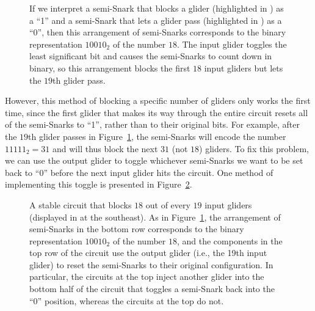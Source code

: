 \begin{figure}[!htb]
	\centering
	\caption{If we interpret a semi-Snark that blocks a glider (highlighted in ) as a ``1'' and a semi-Snark that lets a glider pass (highlighted in ) as a ``0'', then this arrangement of semi-Snarks corresponds to the binary representation $10010_2$ of the number $18$. The input glider toggles the least significant bit and causes the semi-Snarks to count down in binary, so this arrangement blocks the first $18$ input gliders but lets the $19$th glider pass.}
	\label{fig:block_18_gliders}
\end{figure}

However, this method of blocking a specific number of gliders only works the first time, since the first glider that makes its way through the entire circuit resets all of the semi-Snarks to ``1'', rather than to their original bits. For example, after the $19$th glider passes in Figure~\ref{fig:block_18_gliders}, the semi-Snarks will encode the number $11111_2 = 31$ and will thus block the next $31$ (not $18$) gliders. To fix this problem, we can use the output glider to toggle whichever semi-Snarks we want to be set back to ``0'' before the next input glider hits the circuit. One method of implementing this toggle is presented in Figure~\ref{fig:block_18_gliders_repeatable}.%

\begin{figure}[!htb]
	\centering
	\caption{A stable circuit that blocks $18$ out of every $19$ input gliders (displayed in  at the southeast). As in Figure~\ref{fig:block_18_gliders}, the arrangement of semi-Snarks in the bottom row corresponds to the binary representation $10010_2$ of the number $18$, and the components in the top row of the circuit use the output glider (i.e., the 19th input glider) to reset the semi-Snarks to their original configuration. In particular, the  circuits at the top inject another glider into the bottom half of the circuit that toggles a semi-Snark back into the ``0'' position, whereas the  circuits at the top do not.}
	\label{fig:block_18_gliders_repeatable}
\end{figure}

